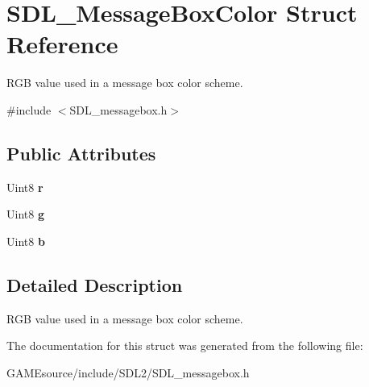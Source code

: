 \hypertarget{struct_s_d_l___message_box_color}{}\section{S\+D\+L\+\_\+\+Message\+Box\+Color Struct Reference}
\label{struct_s_d_l___message_box_color}


R\+GB value used in a message box color scheme.  




{\ttfamily \#include $<$S\+D\+L\+\_\+messagebox.\+h$>$}

\subsection*{Public Attributes}
\begin{DoxyCompactItemize}
\item 
\mbox{\label{struct_s_d_l___message_box_color_a43ab2172c10058380fcf67ecc3f53184}} 
Uint8 {\bfseries r}
\item 
\mbox{\label{struct_s_d_l___message_box_color_a5820adab0b32aa3eade101ea36ed6b4a}} 
Uint8 {\bfseries g}
\item 
\mbox{\label{struct_s_d_l___message_box_color_ad1215a42167cb5b190ff8f19dbd42066}} 
Uint8 {\bfseries b}
\end{DoxyCompactItemize}


\subsection{Detailed Description}
R\+GB value used in a message box color scheme. 

The documentation for this struct was generated from the following file\+:\begin{DoxyCompactItemize}
\item 
G\+A\+M\+Esource/include/\+S\+D\+L2/S\+D\+L\+\_\+messagebox.\+h\end{DoxyCompactItemize}
